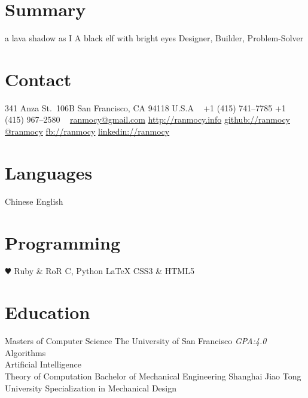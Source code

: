\documentclass[]{friggeri-cv} %
\begin{document}


\begin{aside} %
  \section{Summary}
  a lava shadow as I
  A black elf
  with bright eyes
  Designer, Builder, Problem-Solver
  \section{Contact}
  341 Anza St.\ 106B
  San Francisco, CA 94118
  U.S.A
  ~
  +1 (415) 741--7785
  +1 (415) 967--2580
  ~
  \href{mailto:ranmocy@gmail.com}{ranmocy@gmail.com}
  \href{http://ranmocy.info}{http://ranmocy.info}
  \href{https://github.com/ranmocy}{github://ranmocy}
  \href{https://twitter.com/ranmocy}{@ranmocy}
  \href{https://facebook.com/ranmocy}{fb://ranmocy}
  \href{http://www.linkedin.com/in/ranmocy}{linkedin://ranmocy}
  \section{Languages}
  Chinese
  English
  \section{Programming}
  {\color{red} $\varheartsuit$} Ruby \& RoR
  C, Python
  LaTeX
  CSS3 \& HTML5
\end{aside}


\section{Education}

\begin{entrylist}
  {Masters \textnormal{of Computer Science}}
  {The University of San Francisco}
  {
    \emph{GPA:4.0}\\
    Algorithms\\
    Artificial Intelligence\\
    Theory of Computation
  }
  {Bachelor \textnormal{of Mechanical Engineering}}
  {Shanghai Jiao Tong University}
  {
    Specialization in Mechanical Design
  }
\end{entrylist}
\end{document}
